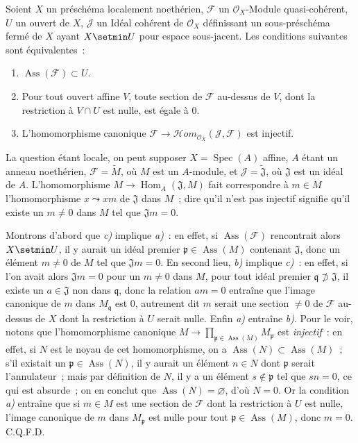 \begin{proposition}[3.1.8]
\label{IV.2.3.1.8-fr}
Soient $X$ un préschéma localement noethérien, $\mathcal F$ un
$\mathcal O_X$-Module quasi-cohérent, $U$ un ouvert de $X$, $\mathcal J$ un
Idéal cohérent de $\mathcal O_X$ définissant un sous-préschéma fermé de $X$
ayant $X\setmin U$ pour espace sous-jacent. Les conditions suivantes sont
équivalentes~:
\begin{enumerate}
\item[\emph{a)}] $\operatorname{Ass}(\mathcal F)\subset U$.
\item[\emph{b)}] Pour tout ouvert affine $V$, toute section de $\mathcal F$
au-dessus de $V$, dont la restriction à $V\cap U$ est nulle, est égale à $0$.
\item[\emph{c)}] L'homomorphisme canonique
$\mathcal F\to\mathcal Hom_{\mathcal O_X}(\mathcal J,\mathcal F)$ est
injectif.
\end{enumerate}
\end{proposition}

La question étant locale, on peut supposer $X=\operatorname{Spec}(A)$ affine,
$A$ étant un anneau noethérien, $\mathcal F=\widetilde M$, où $M$ est un
$A$-module, et $\mathcal J=\widetilde{\mathfrak J}$, où $\mathfrak J$ est un
idéal de $A$. L'homomorphisme $M\to\operatorname{Hom}_A(\mathfrak J,M)$ fait
correspondre à $m\in M$ l'homomorphisme $x\leadsto xm$ de $\mathfrak J$ dans
$M$~; dire qu'il n'est pas injectif signifie qu'il existe un $m\ne0$ dans
$M$ tel que $\mathfrak Jm=0$.

Montrons d'abord que \emph{c)} implique \emph{a)}~: en effet, si
$\operatorname{Ass}(\mathcal F)$ rencontrait alors $X\setmin U$, il y aurait un
idéal premier $\mathfrak p\in\operatorname{Ass}(M)$ contenant $\mathfrak J$,
donc un élément $m\ne0$ de $M$ tel que $\mathfrak Jm=0$. En second lieu,
\emph{b)} implique \emph{c)}~: en effet, si l'on avait alors
$\mathfrak Jm=0$ pour un $m\ne0$ dans $M$, pour tout idéal premier
$\mathfrak q\not\supset\mathfrak J$, il existe un $a\in\mathfrak J$ non dans
$\mathfrak q$, donc la relation $am=0$ entraîne que l'image canonique de $m$
dans $M_\mathfrak q$ est $0$, autrement dit $m$ serait une section $\ne0$ de
$\mathcal F$ au-dessus de $X$ dont la restriction à $U$ serait nulle.
Enfin \emph{a)} entraîne \emph{b)}. Pour le voir, notons que l'homomorphisme
canonique
$M\longrightarrow\prod_{\mathfrak p\in\operatorname{Ass}(M)}M_\mathfrak p$
est \emph{injectif}~: en effet, si $N$ est le noyau de cet homomorphisme, on a
$\operatorname{Ass}(N)\subset\operatorname{Ass}(M)$~; s'il existait un
$\mathfrak p\in\operatorname{Ass}(N)$, il y aurait un élément $n\in N$ dont
$\mathfrak p$ serait l'annulateur~; mais par définition de $N$, il y a un
élément $s\notin\mathfrak p$ tel que $sn=0$, ce qui est absurde~; on en conclut
que $\operatorname{Ass}(N)=\varnothing$, d'où $N=0$. Or la condition
\emph{a)} entraîne que si $m\in M$ est une section de $\mathcal F$ dont la
restriction à $U$ est nulle, l'image canonique de $m$ dans $M_\mathfrak p$ est
nulle pour tout $\mathfrak p\in\operatorname{Ass}(M)$, donc $m=0$. C.Q.F.D.

